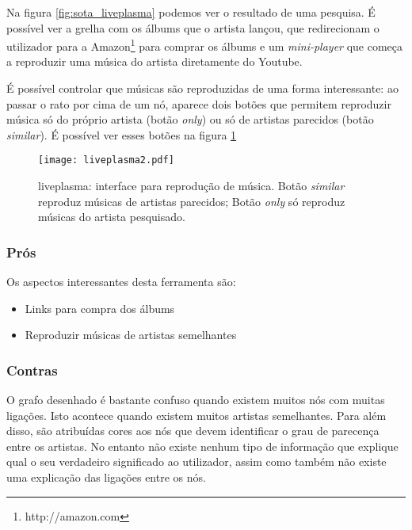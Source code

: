 Na figura \ref{fig:sota_liveplasma} podemos ver o resultado de uma pesquisa.
É possível ver a grelha com os álbums que o artista lançou, que redirecionam o utilizador para a Amazon\footnote{http://amazon.com} para comprar os álbums e um \emph{mini-player} que começa a reproduzir uma música do artista diretamente do Youtube.

É possível controlar que músicas são reproduzidas de uma forma interessante: ao passar o rato por cima de um nó, aparece dois botões que permitem reproduzir música só do próprio artista (botão \emph{only}) ou só de artistas parecidos (botão \emph{similar}).
É possível ver esses botões na figura \ref{fig:sota_liveplasma2}

\begin{figure}[tb]
  \begin{center}
    \texttt{[image: liveplasma2.pdf]}
  \end{center}
  \caption{liveplasma: interface para reprodução de música. Botão \emph{similar} reproduz músicas de artistas parecidos; Botão \emph{only} só reproduz músicas do artista pesquisado.}
  \label{fig:sota_liveplasma2}
\end{figure}

\subsubsection{Prós} %
\label{ssub:liveplasma_pros}

Os aspectos interessantes desta ferramenta são:

\begin{itemize}
  \item Links para compra dos álbums
  \item Reproduzir músicas de artistas semelhantes
\end{itemize}


\subsubsection{Contras} %
\label{ssub:liveplasma_contras}

O grafo desenhado é bastante confuso quando existem muitos nós com muitas ligações.
Isto acontece quando existem muitos artistas semelhantes.
Para além disso, são atribuídas cores aos nós que devem identificar o grau de parecença entre os artistas.
No entanto não existe nenhum tipo de informação que explique qual o seu verdadeiro significado ao utilizador, assim como também não existe uma explicação das ligações entre os nós.

